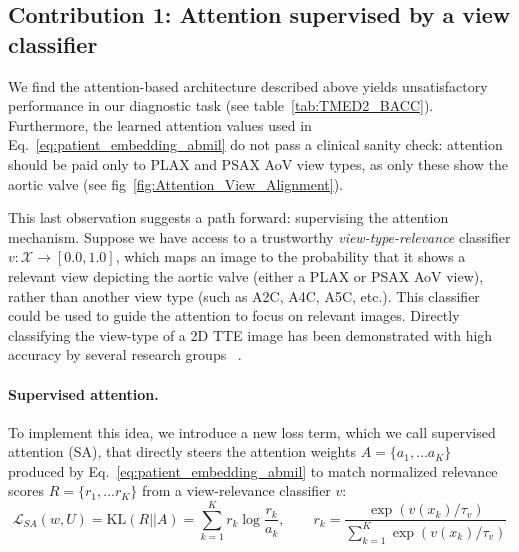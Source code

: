


\subsection{Contribution 1: Attention supervised by a view classifier}
\label{sec:methods_SA}

We find the attention-based architecture described above yields unsatisfactory performance in our diagnostic task (see table~\ref{tab:TMED2_BACC}). Furthermore, the learned attention values used in Eq.~\eqref{eq:patient_embedding_abmil} do not pass a clinical sanity check: attention should be paid only to PLAX and PSAX AoV view types, as only these show the aortic valve (see fig~\ref{fig:Attention_View_Alignment}).

This last observation suggests a path forward: supervising the attention mechanism. Suppose we have access to a trustworthy \emph{view-type-relevance} classifier $v : \mathcal{X} \rightarrow [0.0,1.0]$, which maps an image to the probability that it shows a relevant view depicting the aortic valve (either a PLAX or PSAX AoV view), rather than another view type (such as A2C, A4C, A5C, etc.).
This classifier could be used to guide the attention to focus on relevant images.
Directly classifying the view-type of a 2D TTE image has been demonstrated with high accuracy by several research groups ~\citep{madani2018fast, zhang2018fully, long2018identification, huang2021new}. 

\paragraph{Supervised attention.}
To implement this idea, we introduce a new loss term, which we call supervised attention (SA), that directly steers the attention weights $A = \{a_1, \ldots a_K\}$ produced by Eq.~\eqref{eq:patient_embedding_abmil} to match normalized relevance scores $R = \{r_1, \ldots r_K\}$ from a view-relevance classifier $v$: 
\begin{equation}
    \label{eq:L_SA}
    \mathcal{L}_{SA}(w, U) = \text{KL}(R || A) = \sum_{k=1}^K r_k \log \frac{r_k}{a_k}, \qquad  r_k = \frac{\exp(v(x_k)/\tau_{v})}{\sum_{k=1}^K \exp( v(x_k) / \tau_{v} ) } 
\end{equation}

